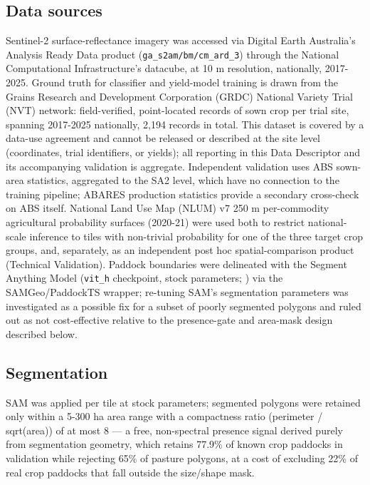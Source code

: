 \subsection*{Data sources}\label{data-sources}

Sentinel-2 surface-reflectance imagery was accessed via Digital Earth Australia's Analysis Ready Data product (\texttt{ga\_s2am/bm/cm\_ard\_3}) through the National Computational Infrastructure's datacube, at 10 m resolution, nationally, 2017-2025. Ground truth for classifier and yield-model training is drawn from the Grains Research and Development Corporation (GRDC) National Variety Trial (NVT) network: field-verified, point-located records of sown crop per trial site, spanning 2017-2025 nationally, 2,194 records in total. This dataset is covered by a data-use agreement and cannot be released or described at the site level (coordinates, trial identifiers, or yields); all reporting in this Data Descriptor and its accompanying validation is aggregate. Independent validation uses ABS sown-area statistics, aggregated to the SA2 level, which have no connection to the training pipeline; ABARES production statistics provide a secondary cross-check on ABS itself. National Land Use Map (NLUM) v7 250 m per-commodity agricultural probability surfaces (2020-21) were used both to restrict national-scale inference to tiles with non-trivial probability for one of the three target crop groups, and, separately, as an independent post hoc spatial-comparison product (Technical Validation). Paddock boundaries were delineated with the Segment Anything Model (\texttt{vit\_h} checkpoint, stock parameters; \citealp{kirillov2023sam}) via the SAMGeo/PaddockTS wrapper; re-tuning SAM's segmentation parameters was investigated as a possible fix for a subset of poorly segmented polygons and ruled out as not cost-effective relative to the presence-gate and area-mask design described below.

\subsection*{Segmentation}\label{segmentation}

SAM was applied per tile at stock parameters; segmented polygons were retained only within a 5-300 ha area range with a compactness ratio (perimeter / sqrt(area)) of at most 8 --- a free, non-spectral presence signal derived purely from segmentation geometry, which retains 77.9\% of known crop paddocks in validation while rejecting 65\% of pasture polygons, at a cost of excluding 22\% of real crop paddocks that fall outside the size/shape mask.

